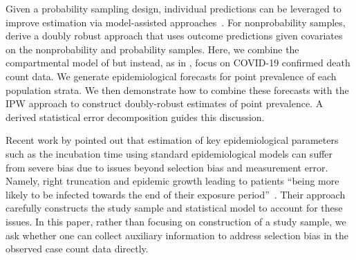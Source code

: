 \documentclass[11pt]{amsart}
\numberwithin{equation}{section}
\theoremstyle{plain}
\begin{document}
Given a probability sampling design, individual predictions can be leveraged to improve estimation via model-assisted approaches~\citep{Breidt2017}.  For nonprobability samples, \cite{Chen2019} derive a doubly robust approach that uses outcome predictions given covariates on the nonprobability and probability samples.  Here, we combine the compartmental model of \cite{Song2020} but instead, as in \cite{Johndrow2020}, focus on COVID-19 confirmed death count data.  We generate epidemiological forecasts for point prevalence of each population strata.  We then demonstrate how to combine these forecasts with the IPW approach to construct doubly-robust estimates of point prevalence.  A derived statistical error decomposition guides this discussion.

Recent work by \cite{Zhao2021} pointed out that estimation of key epidemiological parameters such as the incubation time using standard epidemiological models can suffer from severe bias due to issues beyond selection bias and measurement error.  Namely, right truncation and epidemic growth leading to patients ``being more likely to be infected towards the end of their exposure period''~\citep[pp. 3]{Zhao2021}.  Their approach carefully constructs the study sample and statistical model to account for these issues.  In this paper, rather than focusing on construction of a study sample, we ask whether one can collect auxiliary information to address selection bias in the observed case count data directly.





\end{document}
